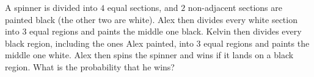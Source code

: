A spinner is divided into $4$ equal sections, and $2$ non-adjacent sections are painted black (the other two are white). Alex then divides every white section into $3$ equal regions and paints the middle one black. Kelvin then divides every black region, including the ones Alex painted, into $3$ equal regions and paints the middle one white. Alex then spins the spinner and wins if it lands on a black region. What is the probability that he wins?
